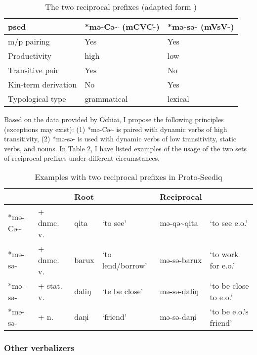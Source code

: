 \begin{table}[!htbp]
\centering
\caption{The two reciprocal prefixes (adapted form \textcite[182]{ochiai2016reciprocals})}
\label{tab:psed_recp_ochi}
\begin{tabular}{lll}
\hline
\ac{psed}           & *mə-Cə\~{} (mCVC-) & *mə-sə- (mVsV-) \\ \hline
m/p pairing         & Yes                & Yes             \\
Productivity        & high               & low             \\
Transitive pair     & Yes                & No              \\
Kin-term derivation & No                 & Yes             \\
Typological type    & grammatical        & lexical         \\ \hline
\end{tabular}
\end{table}

Based on the data provided by Ochiai, I propose the following principles (exceptions may exist): (1) *mə-Cə\~{} is paired with dynamic verbs of high transitivity, (2) *mə-sə- is used with dynamic verbs of low transitivity, static verbs, and nouns. In Table \ref{tab:psed_recp_ex}, I have listed examples of the usage of the two sets of reciprocal prefixes under different circumstances.

\begin{table}[!htbp]
\centering
\caption{Examples with two reciprocal prefixes in Proto-Seediq}
\label{tab:psed_recp_ex}
\begin{tabular}{llllll}
\hline
           &            & Root  &                  & Reciprocal    &                            \\ \hline
*mə-Cə\~{} & + dnmc. v. & qita  & `to see'         & mə-qə\~{}qita & `to see e.o.'              \\
*mə-sə-    & + dnmc. v. & barux & `to lend/borrow' & mə-sə-barux   & `to work for e.o.' \\
*mə-sə-    & + stat. v. & daliŋ & `te be close'    & mə-sə-daliŋ   & `to be close to e.o.'      \\
*mə-sə-    & + n.       & daŋi  & `friend'         & mə-sə-daŋi    & `to be e.o.'s friend'  \\ \hline
\end{tabular}
\end{table}

\subsubsection{Other verbalizers}


